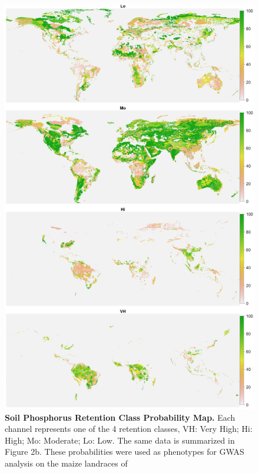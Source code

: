 \documentclass[10pt,letterpaper]{article}
\begin{document}
\begin{figure}[htp] %

\includegraphics[width=\textwidth]{fig2.png}

\caption{\textbf{Soil Phosphorus Retention Class Probability Map.} Each channel represents one of the 4 retention classes, VH: Very High; Hi: High; Mo: Moderate; Lo: Low. The same data is summarized in Figure 2b. These probabilities were used as phenotypes for GWAS analysis on the maize landraces of \cite{romeronavarro2017}}

\label{fig2} %

\end{figure}
\end{document}
